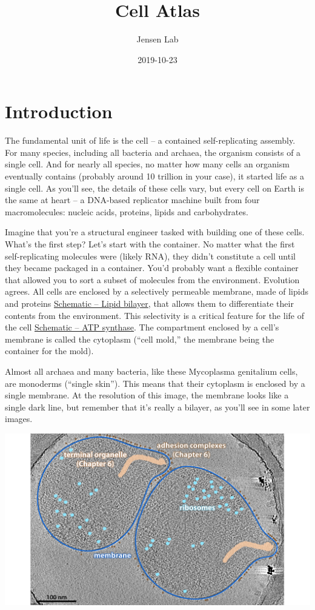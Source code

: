\documentclass[]{book}
\title{Cell Atlas}
\author{Jensen Lab}
\date{2019-10-23}
\begin{document}
\maketitle

{
\setcounter{tocdepth}{1}
\tableofcontents
}
\hypertarget{bilayer}{\chapter{Introduction}\label{bilayer}}

The fundamental unit of life is the cell -- a contained self-replicating
assembly. For many species, including all bacteria and archaea, the
organism consists of a single cell. And for nearly all species, no
matter how many cells an organism eventually contains (probably around
10 trillion in your case), it started life as a single cell. As you'll
see, the details of these cells vary, but every cell on Earth is the
same at heart -- a DNA-based replicator machine built from four
macromolecules: nucleic acids, proteins, lipids and carbohydrates.

Imagine that you're a structural engineer tasked with building one of
these cells. What's the first step? Let's start with the container. No
matter what the first self-replicating molecules were (likely RNA), they
didn't constitute a cell until they became packaged in a container.
You'd probably want a flexible container that allowed you to sort a
subset of molecules from the environment. Evolution agrees. All cells
are enclosed by a selectively permeable membrane, made of lipids and
proteins \protect\hyperlink{bilayer}{Schematic -- Lipid bilayer}, that
allows them to differentiate their contents from the environment. This
selectivity is a critical feature for the life of the cell
\protect\hyperlink{atp}{Schematic -- ATP synthase}. The compartment
enclosed by a cell's membrane is called the cytoplasm (``cell mold,''
the membrane being the container for the mold).

Almost all archaea and many bacteria, like these Mycoplasma genitalium
cells, are monoderms (``single skin''). This means that their cytoplasm
is enclosed by a single membrane. At the resolution of this image, the
membrane looks like a single dark line, but remember that it's really a
bilayer, as you'll see in some later images.

\includegraphics{img/02_static/2_1_Mgenitalium.jpg}
\end{document}
